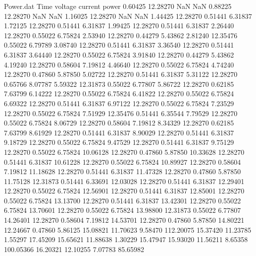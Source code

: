 \begin{filecontents}{Power.dat}
Time voltage current power
   0.60425   12.28270        NaN        NaN
   0.88225   12.28270        NaN        NaN
   1.16025   12.28270        NaN        NaN
   1.44425   12.28270    0.51441    6.31837
   1.72125   12.28270    0.51441    6.31837
   1.99425   12.28270    0.51441    6.31837
   2.26440   12.28270    0.55022    6.75824
   2.53940   12.28270    0.44279    5.43862
   2.81240   12.35476    0.55022    6.79789
   3.08740   12.28270    0.51441    6.31837
   3.36540   12.28270    0.51441    6.31837
   3.64440   12.28270    0.55022    6.75824
   3.91840   12.28270    0.44279    5.43862
   4.19240   12.28270    0.58604    7.19812
   4.46640   12.28270    0.55022    6.75824
   4.74240   12.28270    0.47860    5.87850
   5.02722   12.28270    0.51441    6.31837
   5.31122   12.28270    0.65766    8.07787
   5.59322   12.31873    0.55022    6.77807
   5.86722   12.28270    0.62185    7.63799
   6.14222   12.28270    0.55022    6.75824
   6.41822   12.28270    0.55022    6.75824
   6.69322   12.28270    0.51441    6.31837
   6.97122   12.28270    0.55022    6.75824
   7.23529   12.28270    0.55022    6.75824
   7.51929   12.35476    0.51441    6.35544
   7.79529   12.28270    0.55022    6.75824
   8.06729   12.28270    0.58604    7.19812
   8.34329   12.28270    0.62185    7.63799
   8.61929   12.28270    0.51441    6.31837
   8.90029   12.28270    0.51441    6.31837
   9.18729   12.28270    0.55022    6.75824
   9.47529   12.28270    0.51441    6.31837
   9.75129   12.28270    0.55022    6.75824
  10.06128   12.28270    0.47860    5.87850
  10.33628   12.28270    0.51441    6.31837
  10.61228   12.28270    0.55022    6.75824
  10.89927   12.28270    0.58604    7.19812
  11.18628   12.28270    0.51441    6.31837
  11.47328   12.28270    0.47860    5.87850
  11.75128   12.31873    0.51441    6.33691
  12.03028   12.28270    0.51441    6.31837
  12.29401   12.28270    0.55022    6.75824
  12.56901   12.28270    0.51441    6.31837
  12.85001   12.28270    0.55022    6.75824
  13.13700   12.28270    0.51441    6.31837
  13.42301   12.28270    0.55022    6.75824
  13.70601   12.28270    0.55022    6.75824
  13.98800   12.31873    0.55022    6.77807
  14.26401   12.28270    0.58604    7.19812
  14.53701   12.28270    0.47860    5.87850
  14.80221   12.24667    0.47860    5.86125
  15.08821   11.70623    9.58470  112.20075
  15.37420   11.23785    1.55297   17.45209
  15.65621   11.88638    1.30229   15.47947
  15.93020   11.56211    8.65358  100.05366
  16.20321   12.10255    7.07783   85.65982

\end{filecontents}
